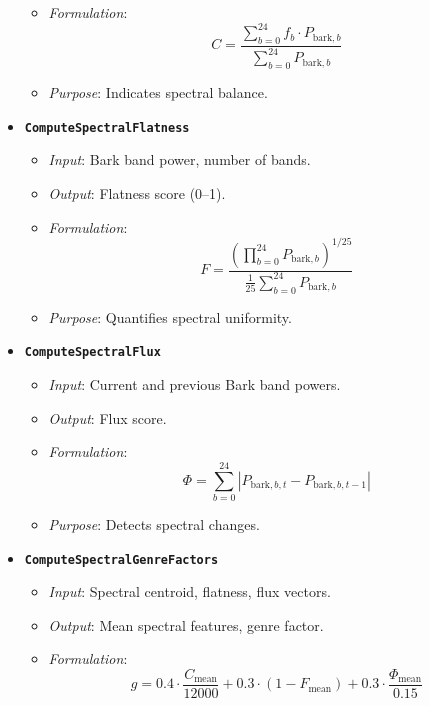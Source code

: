 \documentclass[11pt]{article}
\begin{document}
\begin{itemize}[label=$\bullet$]
\begin{itemize}
      \item \textit{Formulation}:
        \begin{equation}
        C = \frac{\sum_{b=0}^{24} f_b \cdot P_{\text{bark},b}}{\sum_{b=0}^{24} P_{\text{bark},b}}
        \end{equation}
      \item \textit{Purpose}: Indicates spectral balance.
    \end{itemize}
  \item \textbf{\texttt{ComputeSpectralFlatness}}
    \begin{itemize}
      \item \textit{Input}: Bark band power, number of bands.
      \item \textit{Output}: Flatness score (0--1).
      \item \textit{Formulation}:
        \begin{equation}
        F = \frac{\left(\prod_{b=0}^{24} P_{\text{bark},b}\right)^{1/25}}{\frac{1}{25} \sum_{b=0}^{24} P_{\text{bark},b}}
        \end{equation}
      \item \textit{Purpose}: Quantifies spectral uniformity.
    \end{itemize}
  \item \textbf{\texttt{ComputeSpectralFlux}}
    \begin{itemize}
      \item \textit{Input}: Current and previous Bark band powers.
      \item \textit{Output}: Flux score.
      \item \textit{Formulation}:
        \begin{equation}
        \Phi = \sum_{b=0}^{24} |P_{\text{bark},b,t} - P_{\text{bark},b,t-1}|
        \end{equation}
      \item \textit{Purpose}: Detects spectral changes.
    \end{itemize}
  \item \textbf{\texttt{ComputeSpectralGenreFactors}}
    \begin{itemize}
      \item \textit{Input}: Spectral centroid, flatness, flux vectors.
      \item \textit{Output}: Mean spectral features, genre factor.
      \item \textit{Formulation}:
        \begin{equation}
        g = 0.4 \cdot \frac{C_{\text{mean}}}{12000} + 0.3 \cdot (1 - F_{\text{mean}}) + 0.3 \cdot \frac{\Phi_{\text{mean}}}{0.15}

\end{equation}
\end{itemize}
\end{itemize}
\end{document}
